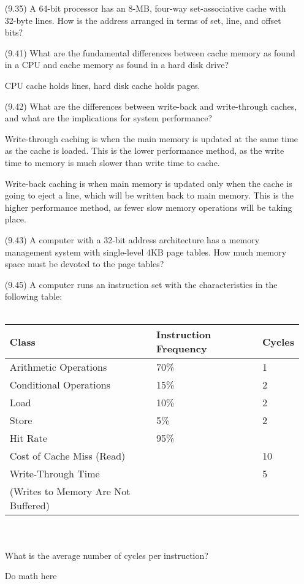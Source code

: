 \documentclass[letterpaper,10pt,titlepage]{article}
\begin{document}
\begin{enumerate}
	\item[(9.35)] A 64-bit processor has an 8-MB, four-way set-associative cache with
		32-byte lines. How is the address arranged in terms of set, line, and
		offset bits?
	\item[\textbullet] 

	\item[(9.41)] What are the fundamental differences between cache memory as found
		in a CPU and cache memory as found in a hard disk drive?
	\item[\textbullet] CPU cache holds lines, hard disk cache holds pages.

	\item[(9.42)] What are the differences between write-back and write-through
		caches, and what are the implications for system performance?
	\item[\textbullet] Write-through caching is when the main memory is updated at the
		same time as the cache is loaded. This is the lower performance method, as
		the write time to memory is much slower than write time to cache.
	\item[\textbullet] Write-back caching is when main memory is updated only when the
		cache is going to eject a line, which will be written back to main memory.
		This is the higher performance method, as fewer slow memory operations
		will be taking place.

	\item[(9.43)] A computer with a 32-bit address architecture has a memory
		management system with single-level 4KB page tables. How much memory space
		must be devoted to the page tables?

	\item[(9.45)] A computer runs an instruction set with the characteristics in the
		following table:\\ \\
		\begin{tabular}{ l l l }
			Class & Instruction Frequency & Cycles \\
			\hline
			Arithmetic Operations & 70\% & 1 \\
			Conditional Operations & 15\% & 2 \\
			Load & 10\% & 2 \\
			Store & 5\% & 2 \\
			Hit Rate & 95\% & \\
			Cost of Cache Miss (Read) & & 10 \\
			Write-Through Time & & 5 \\
			(Writes to Memory Are Not Buffered) & & \\ 
		\end{tabular} \\ \\
		What is the average number of cycles per instruction?
	\item[\textbullet] Do math here


\end{enumerate}
\end{document}
